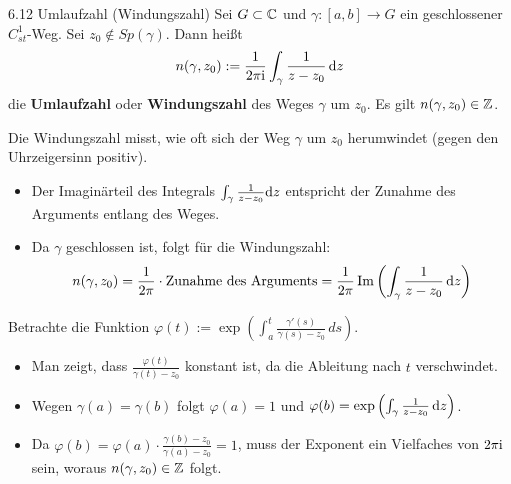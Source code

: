 
\begin{defi}{6.12 Umlaufzahl (Windungszahl)}
Sei $G \subset \mathbb{C}$ und $\gamma: [a,b] \to G$ ein geschlossener $C_{st}^1$-Weg. Sei $z_0 \notin Sp(\gamma)$. Dann heißt
\[
    n(\gamma, z_0) := \frac{1}{2\pi\mathrm{i}} \int_\gamma \frac{1}{z-z_0} \, \mathrm{d}z
\]
die \textbf{Umlaufzahl} oder \textbf{Windungszahl} des Weges $\gamma$ um $z_0$. Es gilt $n(\gamma, z_0) \in \Z$.
\end{defi}

\begin{tcolorbox}[colback=white, colframe=black!70, title={Intuition zur Windungszahl}]
Die Windungszahl misst, wie oft sich der Weg $\gamma$ um $z_0$ herumwindet (gegen den Uhrzeigersinn positiv).
\begin{itemize}
    \item Der Imaginärteil des Integrals $\int_\gamma \frac{1}{z-z_0} \mathrm{d}z$ entspricht der Zunahme des Arguments entlang des Weges.
    \item Da $\gamma$ geschlossen ist, folgt für die Windungszahl:
    \[
        n(\gamma, z_0) = \frac{1}{2\pi} \cdot \text{Zunahme des Arguments} = \frac{1}{2\pi} \operatorname{Im} \left( \int_\gamma \frac{1}{z-z_0} \, \mathrm{d}z \right)
    \]
\end{itemize}
\end{tcolorbox}

\begin{tcolorbox}[colback=blue!5!white, colframe=blue!75!black, title={Beweisskizze für $n(\gamma, z_0) \in \Z$}]
Betrachte die Funktion $\varphi(t) := \exp \left( \int_a^t \frac{\gamma'(s)}{\gamma(s)-z_0} \, ds \right)$.
\begin{itemize}
    \item Man zeigt, dass $\frac{\varphi(t)}{\gamma(t)-z_0}$ konstant ist, da die Ableitung nach $t$ verschwindet.
    \item Wegen $\gamma(a) = \gamma(b)$ folgt $\varphi(a) = 1$ und $\varphi(b) = \exp \left( \int_\gamma \frac{1}{z-z_0} \, \mathrm{d}z \right)$.
    \item Da $\varphi(b) = \varphi(a) \cdot \frac{\gamma(b)-z_0}{\gamma(a)-z_0} = 1$, muss der Exponent ein Vielfaches von $2\pi\mathrm{i}$ sein, woraus $n(\gamma, z_0) \in \Z$ folgt.
\end{itemize}
\end{tcolorbox}

